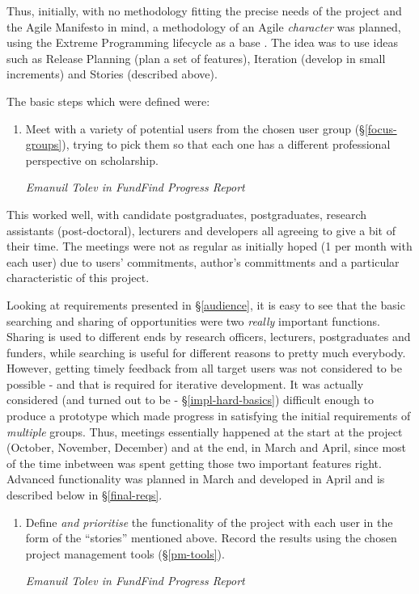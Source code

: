 Thus, initially, with no methodology fitting the precise needs of the project and the Agile Manifesto \cite{agile-manifesto} in mind, a methodology of an Agile \emph{character} was planned, using the Extreme Programming lifecycle as a base \cite{xp-lifecycle}. The idea was to use ideas such as Release Planning (plan a set of features), Iteration (develop in small increments) and Stories (described above).

The basic steps which were defined were:
\begin{shadequote}
\begin{enumerate}
	\item Meet with a variety of potential users from the chosen user group (\S\ref{focus-groups}), trying to pick them so that each one has a different professional perspective on scholarship.
	\par\emph{Emanuil Tolev in FundFind Progress Report \cite{progress-report}}
	\setcounter{tmpc}{\theenumi}
\end{enumerate}
\end{shadequote}

This worked well, with candidate postgraduates, postgraduates, research assistants (post-doctoral), lecturers and developers all agreeing to give a bit of their time. The meetings were not as regular as initially hoped (1 per month with each user) due to users' commitments, author's committments and a particular characteristic of this project.

Looking at requirements presented in \S\ref{audience}, it is easy to see that the basic searching and sharing of opportunities were two \emph{really} important functions. Sharing is used to different ends by research officers, lecturers, postgraduates and funders, while searching is useful for different reasons to pretty much everybody. However, getting timely feedback from all target users was not considered to be possible - and that is required for iterative development. It was actually considered (and turned out to be - \S\ref{impl-hard-basics}) difficult enough to produce a prototype which made progress in satisfying the initial requirements of \emph{multiple} groups. Thus, meetings essentially happened at the start at the project (October, November, December) and at the end, in March and April, since most of the time inbetween was spent getting those two important features right. Advanced functionality was planned in March and developed in April and is described below in \S\ref{final-reqs}.

\begin{shadequote}
\begin{enumerate}
	\setcounter{enumi}{\thetmpc}
	\item Define \emph{and prioritise} the functionality of the project with each user in the form of the ``stories'' mentioned above. Record the results using the chosen project management tools (\S\ref{pm-tools}).
	\par\emph{Emanuil Tolev in FundFind Progress Report \cite{progress-report}}
	\setcounter{tmpc}{\theenumi}
\end{enumerate}
\end{shadequote}

